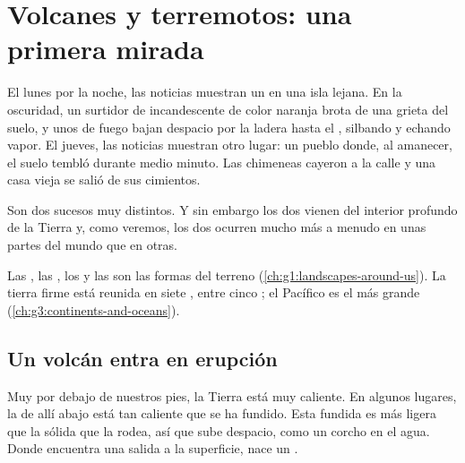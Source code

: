 \chapter{Volcanes y terremotos: una primera mirada}\label{ch:g4:volcanoes-earthquakes-first-look}

El lunes por la noche, las noticias muestran un  en una isla lejana.
En la oscuridad, un surtidor de  incandescente de color naranja brota de
una grieta del suelo, y unos  de fuego bajan despacio por la ladera
hasta el , silbando y echando vapor. El jueves, las noticias muestran
otro lugar: un pueblo donde, al amanecer, el suelo tembló durante medio
minuto. Las chimeneas cayeron a la calle y una casa vieja se salió de sus
cimientos.

Son dos sucesos muy distintos. Y sin embargo los dos vienen del interior
profundo de la Tierra y, como veremos, los dos ocurren mucho más a menudo
en unas partes del mundo que en otras.

\begin{recall}
Las , las , los  y las  son las formas del
terreno (\cref{ch:g1:landscapes-around-us}). La tierra firme está reunida en
siete , entre cinco ; el Pacífico es el  más grande
(\cref{ch:g3:continents-and-oceans}).
\end{recall}

\section{Un volcán entra en erupción}

Muy por debajo de nuestros pies, la Tierra está muy caliente. En algunos
lugares, la  de allí abajo está tan caliente que se ha fundido. Esta
 fundida es más ligera que la  sólida que la rodea, así que sube
despacio, como un corcho en el agua. Donde encuentra una salida a la
superficie, nace un .

